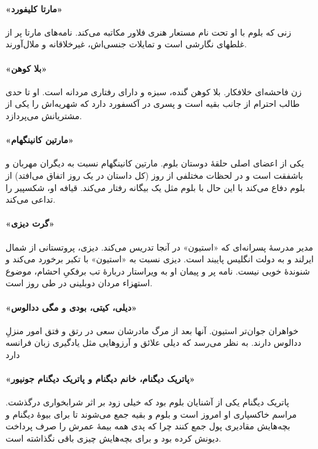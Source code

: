 \documentclass[12pt]{book}
\newcommand{\noun}[1]{«{#1}»}
\begin{document}
    \paragraph{\noun{مارتا کلیفورد}\protect{}}
    زنی که بلوم با او تحت نام مستعار هنری فلاور مکاتبه می‌کند. نامه‌های مارتا پر از غلطهای نگارشی است و تمایلات جنسی‌اش، غیرخلاقانه و ملال‌آورند.
    \paragraph{\noun{بلا کوهن}\protect{}}
    زن فاحشه‌ای خلافکار. بلا کوهن گنده، سبزه و دارای رفتاری مردانه است. او تا حدی طالب احترام از جانب بقیه است و پسری در آکسفورد دارد که شهریه‌اش را یکی از مشتریانش می‌پردازد.
    \paragraph{\noun{مارتین کانینگهام}\protect{}}
    یکی از اعضای اصلی حلقۀ دوستان بلوم. مارتین کانینگهام نسبت به دیگران مهربان و باشفقت است و در لحظات مختلفی از روز (کل داستان در یک روز اتفاق می‌افتد) از بلوم دفاع می‌کند با این حال با بلوم مثل یک بیگانه رفتار می‌کند. قیافه او، شکسپیر را تداعی می‌کند.
    \paragraph{\noun{گرت دیزی}\protect{}}
    مدیر مدرسۀ پسرانه‌ای که \noun{استیون} در آنجا تدریس می‌کند. دیزی، پروتستانی از شمال ایرلند و به دولت انگلیس پایبند است. دیزی نسبت به \noun{استیون} با تکبر برخورد می‌کند و شنوندۀ خوبی نیست. نامه پر و پیمان او به ویراستار دربارۀ تب برفکیِ احشام، موضوع استهزاء مردان دوبلینی در طی روز است.
    \paragraph{\noun{دیلی، کیتی، بودی و مگی ددالوس}\protect{}}
    خواهران جوان‌تر استیون. آنها بعد از مرگ مادرشان سعی در رتق و فتق امور منزلِ ددالوس دارند. به نظر می‌رسد که دیلی علائق و آرزوهایی مثل یادگیری زبان فرانسه دارد
    \paragraph{\noun{پاتریک دیگنام، خانم دیگنام و پاتریک دیگنام جونیور}\protect{}}
    پاتریک دیگنام یکی از آشنایان بلوم بود که خیلی زود بر اثر شرابخواری درگذشت. مراسم خاکسپاری او امروز است و بلوم و بقیه جمع می‌شوند تا برای بیوۀ دیگنام و بچه‌هایش مقادیری پول جمع کنند چرا که پدی همه بیمۀ عمرش را صرف پرداخت دیونش کرده بود و برای بچه‌هایش چیزی باقی نگذاشته است.
\end{document}
